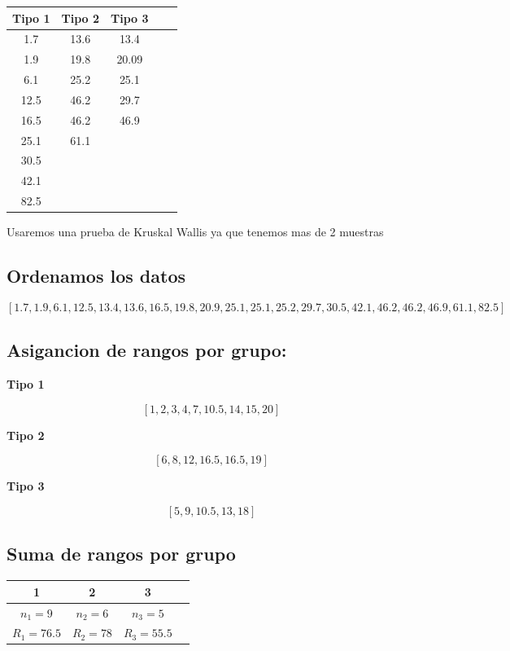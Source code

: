 \documentclass{article}
\begin{document}
\begin{table}[ht]
    \centering
    \begin{tabular}{ccccc}
        \toprule
        Tipo 1 & Tipo 2 & Tipo 3 \\
        \midrule
        1.7    & 13.6   & 13.4   \\
        1.9    & 19.8   & 20.09  \\
        6.1    & 25.2   & 25.1   \\
        12.5   & 46.2   & 29.7   \\
        16.5   & 46.2   & 46.9   \\
        25.1   & 61.1   &        \\
        30.5   &        &        \\
        42.1   &        &        \\
        82.5   &        &        \\
        \bottomrule
    \end{tabular}
\end{table}

Usaremos una prueba de Kruskal Wallis ya que tenemos mas de 2 muestras

\subsection*{Ordenamos los datos}

\[[1{.}7, 1{.}9, 6{.}1, 12{.}5, 13{.}4, 13{.}6, 16{.}5, 19{.}8, 20{.}9, 25{.}1, 25{.}1, 25{.}2, 29{.}7, 30{.}5, 42{.}1, 46{.}2, 46{.}2, 46{.}9, 61{.}1, 82{.}5]\]

\subsection*{Asigancion de rangos por grupo:}

\textbf{Tipo 1}

\[[ 1, 2, 3, 4, 7, 10{.}5, 14, 15, 20 ]\]

\textbf{Tipo 2}

\[[6, 8, 12, 16{.}5, 16{.}5, 19]\]

\textbf{Tipo 3}

\[[5, 9, 10{.}5, 13,  18]\]

\subsection*{Suma de rangos por grupo}

\begin{table}[ht]
    \centering
    \begin{tabular}{cccc}
        \toprule
        1            & 2          & 3            \\
        \midrule
        $n_1 = 9$    & $n_2 = 6$  & $n_3 = 5$    \\
        $R_1 = 76.5$ & $R_2 = 78$ & $R_3 = 55.5$ \\
        \bottomrule
    \end{tabular}
\end{table}
\end{document}
